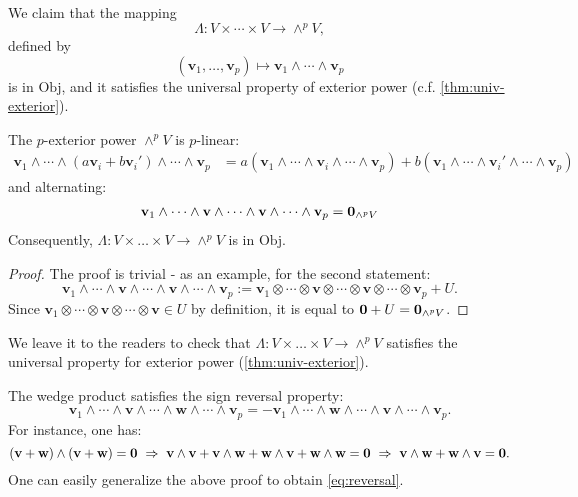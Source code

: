 We claim that the mapping
\[
\Lambda : V \times \cdots \times V \to  \wedge^p V,\] 
defined by \[(\mathbf{v}_1, \ldots, \mathbf{v}_p) \mapsto \mathbf{v}_1 \wedge \cdots \wedge \mathbf{v}_p
\]
is in $\mathrm{Obj}$, and it satisfies the universal property of exterior power (c.f. \autoref{thm:univ-exterior}).
\begin{proposition} \label{prop:wedge_alternating}
The $p$-exterior power $\wedge^p V$ is $p$-linear: 
\begin{align*}
\mathbf{v}_1 \wedge \cdots \wedge (a\mathbf{v}_i + b \mathbf{v}_i') \wedge \cdots \wedge \mathbf{v}_p &= a \left(\mathbf{v}_1 \wedge \cdots \wedge \mathbf{v}_i \wedge \cdots \wedge \mathbf{v}_p\right) + b \left(\mathbf{v}_1 \wedge \cdots \wedge \mathbf{v}_i' \wedge \cdots \wedge \mathbf{v}_p\right)
\end{align*}
and alternating:
  \begin{align*}
    \mathbf{v}_1 \wedge \cdots \wedge \mathbf{v} \wedge \cdots \wedge \mathbf{v} \wedge \cdots \wedge \mathbf{v}_p = {\bf 0}_{\wedge^pV}
  \end{align*}
Consequently, $\Lambda: V \times \dots \times V \to \wedge^pV$ is in $\mathrm{Obj}$.
\end{proposition}
\begin{proof}
The proof is trivial - as an example, for the second statement:
$$\mathbf{v}_1 \wedge \cdots \wedge \mathbf{v} \wedge \cdots \wedge \mathbf{v} \wedge \cdots \wedge \mathbf{v}_p := \mathbf{v}_1 \otimes \cdots \otimes \mathbf{v} \otimes \cdots \otimes \mathbf{v} \otimes \cdots \otimes \mathbf{v}_p + U.$$
Since $\mathbf{v}_1 \otimes \cdots \otimes \mathbf{v} \otimes \cdots \otimes \mathbf{v} \in U$ by definition, it is equal to  ${\bf 0} + U = {\bf 0}_{\wedge^p V}$. 
\end{proof}

We leave it to the readers to check that $\Lambda: V \times \dots \times V \to \wedge^p V$ satisfies the universal property for exterior power (\autoref{thm:univ-exterior}). 

\begin{remark} \label{rmk:wedge_alternating}
The wedge product satisfies the sign reversal property:
  \begin{equation} \label{eq:reversal}
    \mathbf{v}_1 \wedge \cdots \wedge \mathbf{v} \wedge \cdots \wedge \mathbf{w} \wedge \cdots \wedge \mathbf{v}_p = -\mathbf{v}_1 \wedge \cdots \wedge \mathbf{w} \wedge \cdots \wedge \mathbf{v} \wedge \cdots \wedge \mathbf{v}_p.
  \end{equation}
For instance, one has:
\[(\mathbf{v} + \mathbf{w}) \wedge (\mathbf{v} + \mathbf{w}) = {\bf 0} \ \Rightarrow \ \mathbf{v} \wedge \mathbf{v} + \mathbf{v} \wedge \mathbf{w} + \mathbf{w} \wedge \mathbf{v} + \mathbf{w} \wedge \mathbf{w} = {\bf 0} \ \Rightarrow \ \mathbf{v} \wedge \mathbf{w} + \mathbf{w} \wedge \mathbf{v} = {\bf 0}.\]
One can easily generalize the above proof to obtain \autoref{eq:reversal}.
\end{remark}


